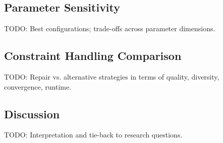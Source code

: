 %

\subsection{Parameter Sensitivity}
TODO: Best configurations; trade-offs across parameter dimensions.

\subsection{Constraint Handling Comparison}
TODO: Repair vs. alternative strategies in terms of quality, diversity, convergence, runtime.

\subsection{Discussion}
TODO: Interpretation and tie-back to research questions.
